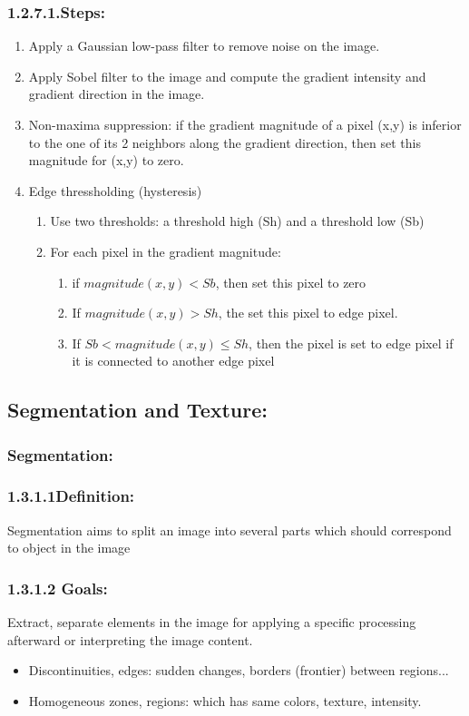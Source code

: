 \subsubsection*{1.2.7.1.\hspace{0.5cm}Steps:}
\begin{enumerate}
\item Apply a Gaussian low-pass filter to remove noise on the image. 
\item Apply Sobel filter to the image and compute the gradient intensity and gradient direction in the image.
\item Non-maxima suppression: if the gradient magnitude of a pixel (x,y) is inferior to the one of its 2 neighbors along the gradient direction, then set this magnitude for (x,y) to zero.
\item Edge thressholding (hysteresis)
\begin{enumerate}
\item Use two thresholds: a threshold high (Sh) and a threshold low (Sb)
\item For each pixel in the gradient magnitude:
\begin{enumerate}
\item if $magnitude(x,y) < Sb$, then set this pixel to zero
\item If $magnitude(x,y) > Sh$, the set this pixel to edge pixel.
\item If $Sb < magnitude(x,y) \leq Sh$, then the pixel is set to edge pixel if it is connected to another edge pixel
\end{enumerate}
\end{enumerate}
\end{enumerate}
\subsection{Segmentation and Texture:}
\subsubsection{Segmentation:}
\subsubsection*{1.3.1.1\hspace{0.5cm}Definition:}
Segmentation aims to split an image into several parts which should correspond to object in the image
\subsubsection*{1.3.1.2\hspace{0.5cm} Goals:} 
Extract, separate elements in the image for applying a specific processing afterward or interpreting the image content.
\begin{itemize}
\item Discontinuities, edges: sudden changes, borders (frontier) between regions...
\item Homogeneous zones, regions: which has same colors, texture, intensity.
\end{itemize}
